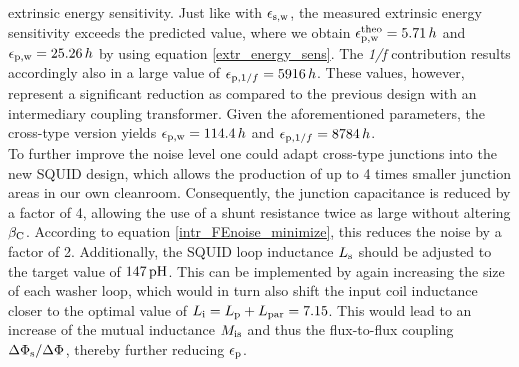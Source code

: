 extrinsic energy sensitivity. Just like with $\epsilon_{\rm s,w}$, the measured extrinsic energy sensitivity exceeds the predicted value, where we obtain $\epsilon_{\rm p,w}^{\rm theo}=5.71\, h$ and $\epsilon_{\rm p,w}=25.26\, h$ by using equation \ref{extr_energy_sens}. The \textit{1/f} contribution results accordingly also in a large value of $\epsilon_{{\rm p},1/f}=5916\, h$. These values, however, represent a significant reduction as compared to the previous design with an intermediary coupling transformer. Given the aforementioned parameters, the cross-type version yields $\epsilon_{\rm p,w}=114.4\, h$ and $\epsilon_{{\rm p},1/f}=8784\, h$. \\

To further improve the noise level one could adapt cross-type junctions into the new SQUID design, which allows the production of up to 4 times smaller junction areas in our own cleanroom. Consequently, the junction capacitance is reduced by a factor of 4, allowing the use of a shunt resistance twice as large without altering $\beta_{\rm C}$. According to equation \ref{intr_FEnoise_minimize}, this reduces the noise by a factor of 2. Additionally, the SQUID loop inductance $L_{\rm s}$ should be adjusted to the target value of $\qty{147}{\pH}$. This can be implemented by again increasing the size of each washer loop, which would in turn also shift the input coil inductance closer to the optimal value of $L_{\rm i}=L_{\rm p}+L_{\rm par}=7.15$. This would lead to an increase of the mutual inductance $M_{\rm is}$ and thus the flux-to-flux coupling $\Delta\Phi_{\rm s}/\Delta\Phi_{\rm }$, thereby further reducing $\epsilon_{\rm p}$.               

